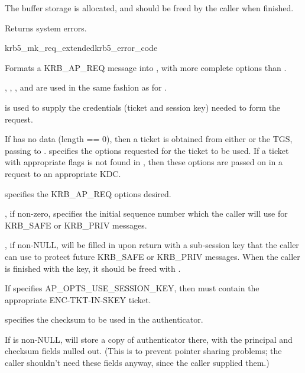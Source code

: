 The  buffer storage is allocated, and should be freed
by the caller when finished.

Returns system errors.


\begin{funcdecl}{krb5_mk_req_extended}{krb5_error_code}{\funcin}
\funcinout
{}
\funcout
{}
\end{funcdecl}

Formats a KRB_AP_REQ message into , with more complete
options than .

, , ,
and  are used in the same fashion as for
.

 is used to supply the credentials (ticket and session
key) needed to form the request.

If  has no data (length == 0), then a
ticket is obtained from either  or the TGS, passing
 to . 
 specifies the options requested for the ticket
to be used. If a ticket with appropriate flags is not found in
, then these options are passed on in a request to an
appropriate KDC.

 specifies the KRB_AP_REQ options desired.

, if non-zero, specifies the initial sequence number
which the caller will use for KRB_SAFE or KRB_PRIV messages.

, if non-NULL, will be filled in upon return with a 
sub-session key that the caller can use to protect future KRB_SAFE or
KRB_PRIV messages.  When the caller is finished with the key, it should
be freed with .

If  specifies AP_OPTS_USE_SESSION_KEY, then
 must contain the appropriate
ENC-TKT-IN-SKEY ticket.

 specifies the checksum to be used in the
authenticator.

If  is non-NULL, 
will store
a copy of authenticator there, with the principal and checksum fields
nulled out.  (This is to prevent pointer sharing problems; the caller
shouldn't need these fields anyway, since the caller supplied them.)

